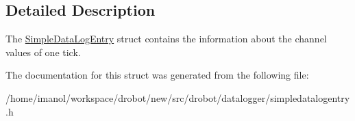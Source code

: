 \subsection{Detailed Description}
The \hyperlink{structdrobot_1_1datalogger_1_1SimpleDataLogEntry}{Simple\-Data\-Log\-Entry} struct contains the information about the channel values of one tick. 

The documentation for this struct was generated from the following file\-:\begin{DoxyCompactItemize}
\item 
/home/imanol/workspace/drobot/new/src/drobot/datalogger/simpledatalogentry.\-h\end{DoxyCompactItemize}
